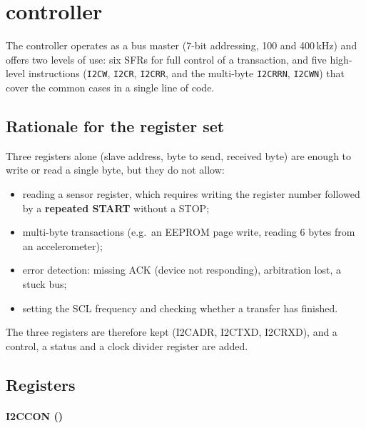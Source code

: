 \section{\texorpdfstring{\IIC{}}{I2C} controller}
\label{sec:i2c}

The \IIC{} controller operates as a bus master (7-bit addressing, 100 and
400\,kHz) and offers two levels of use: six SFRs for full control of a
transaction, and five high-level instructions (\texttt{I2CW},
\texttt{I2CR}, \texttt{I2CRR}, and the multi-byte \texttt{I2CRRN},
\texttt{I2CWN}) that cover the common cases in a single line of code.

\subsection{Rationale for the register set}

Three registers alone (slave address, byte to send, received byte) are enough
to write or read a single byte, but they do not allow:

\begin{itemize}
  \item reading a sensor register, which requires writing the register number
        followed by a \textbf{repeated START} without a STOP;
  \item multi-byte transactions (e.g.\ an EEPROM page write, reading 6 bytes
        from an accelerometer);
  \item error detection: missing ACK (device not responding), arbitration
        lost, a stuck bus;
  \item setting the SCL frequency and checking whether a transfer has finished.
\end{itemize}

The three registers are therefore kept (I2CADR, I2CTXD, I2CRXD), and a
control, a status and a clock divider register are added.

\subsection{Registers}

\paragraph{I2CCON ()}

